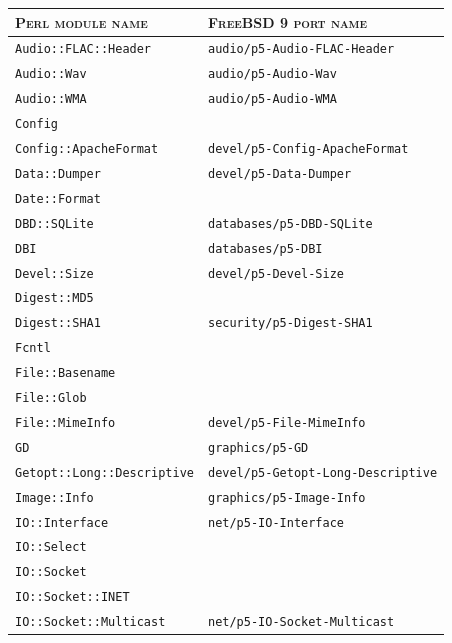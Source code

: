 \documentclass[a4paper,oneside,10pt]{report}
\begin{document}
\begin{table}
	\centering
	\begin{tabular}{|p{15em}|p{17em}|}
		\hline
		\textsc{Perl module name} 				&  \textsc{FreeBSD 9 port name}\\
		\hline
		\hline
		\verb|Audio::FLAC::Header| 				& \verb|audio/p5-Audio-FLAC-Header| \\
		\hline
		\verb|Audio::Wav| 								& \verb|audio/p5-Audio-Wav| \\
		\hline
		\verb|Audio::WMA| 								& \verb|audio/p5-Audio-WMA| \\
		\hline
		\verb|Config| 										& \\
		\hline
		\verb|Config::ApacheFormat|				& \verb|devel/p5-Config-ApacheFormat| \\
		\hline
		\verb|Data::Dumper| 							& \verb|devel/p5-Data-Dumper| \\
		\hline
		\verb|Date::Format| 							&	\\
		\hline
		\verb|DBD::SQLite|								& \verb|databases/p5-DBD-SQLite| \\
		\hline
		\verb|DBI|												& \verb|databases/p5-DBI| \\
		\hline
		\verb|Devel::Size| 								& \verb|devel/p5-Devel-Size| \\
		\hline
		\verb|Digest::MD5| 								& \\
		\hline
		\verb|Digest::SHA1| 							& \verb|security/p5-Digest-SHA1| \\
		\hline
		\verb|Fcntl| 											& \\
		\hline
		\verb|File::Basename| 						& \\
		\hline
		\verb|File::Glob| 								& \\
		\hline
		\verb|File::MimeInfo| 						& \verb|devel/p5-File-MimeInfo| \\
		\hline
		\verb|GD| 												& \verb|graphics/p5-GD| \\
		\hline
		\verb|Getopt::Long::Descriptive| 	& \verb|devel/p5-Getopt-Long-Descriptive| \\
		\hline
		\verb|Image::Info| 								& \verb|graphics/p5-Image-Info| \\
		\hline
		\verb|IO::Interface| 							& \verb|net/p5-IO-Interface| \\
		\hline
		\verb|IO::Select| 								& \\
		\hline
		\verb|IO::Socket| 								& \\
		\hline
		\verb|IO::Socket::INET| 					& \\
		\hline
		\verb|IO::Socket::Multicast| 			& \verb|net/p5-IO-Socket-Multicast| \\

\end{tabular}
\end{table}
\end{document}
